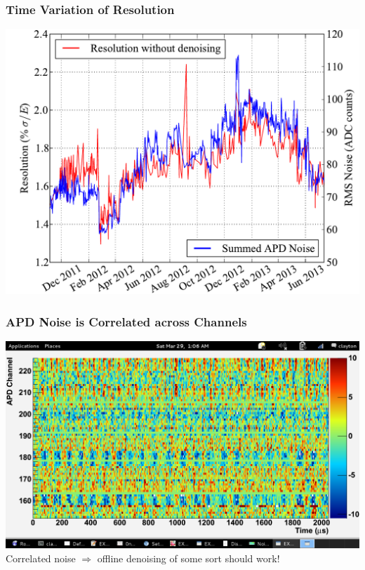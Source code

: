 \documentclass{beamer}
\begin{document}
\begin{frame}
\begin{center}
\frametitle{Time Variation of Resolution}
\end{center}
\vspace{1cm}
\includegraphics[keepaspectratio=true,width=\textwidth]{ResolutionAPDNoiseComparison.pdf}
\end{frame}


\begin{frame}
\begin{center}
\frametitle{APD Noise is Correlated across Channels}
\end{center}
\vspace{1cm}
\includegraphics[keepaspectratio=true,width=\textwidth,clip=true,trim=0mm 12mm 0mm 10mm]{Run4705Ev2_noiseEventDisplay.png}\\
Correlated noise $\Rightarrow$ offline denoising of some sort should work!
\end{frame}
\end{document}
